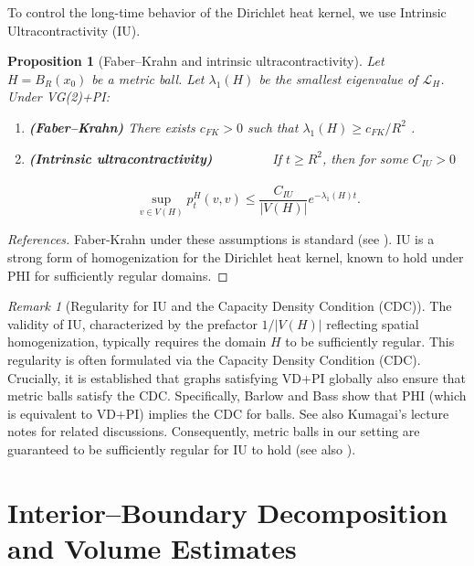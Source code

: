 \documentclass[12pt]{amsart}
\newtheorem{proposition}[theorem]{Proposition}
\theoremstyle{definition}
\theoremstyle{remark}
\newtheorem{remark}[theorem]{Remark}
\newcommand{\LL}{\mathcal{L}} %
\begin{document}
To control the long-time behavior of the Dirichlet heat kernel, we use Intrinsic Ultracontractivity (IU).

\begin{proposition}[Faber--Krahn and intrinsic ultracontractivity]\label{prop:IU}
Let $H=B_R(x_0)$ be a metric ball. Let $\lambda_1(H)$ be the smallest eigenvalue of $\LL_H$. Under VG(2)+PI:
\begin{enumerate}
    \item \textbf{(Faber--Krahn)} There exists $c_{FK}>0$ such that $\lambda_1(H)\ge c_{FK}/R^{2}$ \cite[Prop.\,5.1]{BarlowBass04}.
    \item \textbf{(Intrinsic ultracontractivity)}
          If $t\ge R^{2}$, then for some $C_{IU}>0$
    \begin{equation}\label{eq:IU}
        \sup_{v \in V(H)} p_t^H(v,v) \leq \frac{C_{IU}}{|V(H)|} e^{-\lambda_1(H) t}.
    \end{equation}
\end{enumerate}
\end{proposition}
\begin{proof}[References]
Faber-Krahn under these assumptions is standard (see \cite{Grigoryan09}). IU is a strong form of homogenization for the Dirichlet heat kernel, known to hold under PHI for sufficiently regular domains.
\end{proof}

\begin{remark}[Regularity for IU and the Capacity Density Condition (CDC)]\label{rem:IU_regularity}
The validity of IU, characterized by the prefactor $1/|V(H)|$ reflecting spatial homogenization, typically requires the domain $H$ to be sufficiently regular. This regularity is often formulated via the Capacity Density Condition (CDC). Crucially, it is established that graphs satisfying VD+PI globally also ensure that metric balls satisfy the CDC.
Specifically, Barlow and Bass \cite[Proposition 3.5]{BarlowBass04} show that PHI (which is equivalent to VD+PI) implies the CDC for balls. See also Kumagai's lecture notes \cite{KumagaiNotes} for related discussions. Consequently, metric balls in our setting are guaranteed to be sufficiently regular for IU to hold (see also \cite{BassKumagai08}).
\end{remark}

\section{Interior--Boundary Decomposition and Volume Estimates}\label{sec:decomposition}
\end{document}
